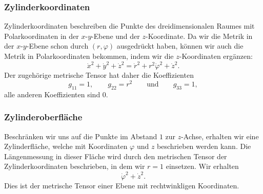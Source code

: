 \subsubsection{Zylinderkoordinaten}
Zylinderkoordinaten beschreiben die Punkte des dreidimensionalen
Raumes mit Polarkoordinaten in der $x$-$y$-Ebene und der $z$-Koordinate.
Da wir die Metrik in der $x$-$y$-Ebene schon durch $(r,\varphi)$
ausgedrückt haben, können wir auch die Metrik in Polarkoordinaten
bekommen, indem wir die $z$-Koordinaten ergänzen:
\[
\dot x^2+\dot y^2 +\dot z^2
=
\dot r^2 + r^2\dot\varphi^2 + \dot z^2.
\]
Der zugehörige metrische Tensor hat daher die Koeffizienten
\[
g_{11}=1,\qquad
g_{22}=r^2
\qquad\text{und}\qquad
g_{33}=1,
\]
alle anderen Koeffizienten sind $0$.

\subsubsection{Zylinderoberfläche}
Beschränken wir uns auf die Punkte im Abstand $1$ zur $z$-Achse, erhalten
wir eine Zylinderfläche, welche mit Koordinaten $\varphi$ und $z$
beschrieben werden kann.
Die Längenmessung in dieser Fläche wird durch den metrischen
Tensor der Zylinderkoordinaten beschrieben, in dem wir $r=1$ einsetzen.
Wir erhalten
\[
\dot\varphi^2+\dot z^2.
\]
Dies ist der metrische Tensor einer Ebene mit rechtwinkligen Koordinaten.

